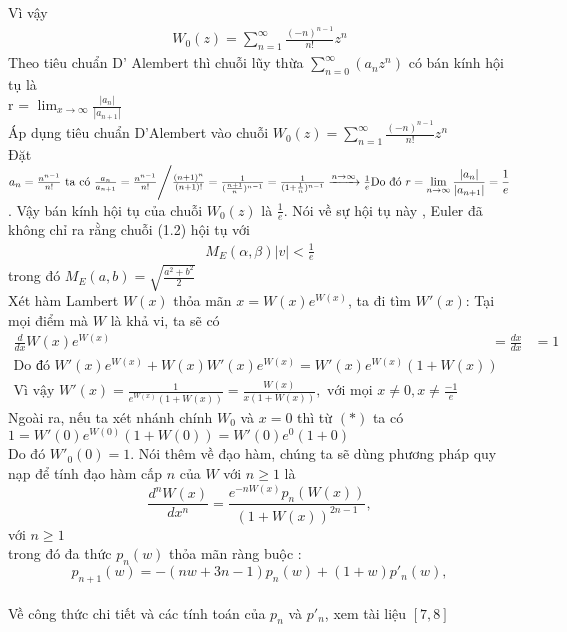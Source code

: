 Vì vậy
\begin{align*}
W_0(z) = \displaystyle \sum_{n=1}^{\infty}\frac{(-n)^{n-1}}{n!}z^{n}
\end{align*}
Theo tiêu chuẩn D' Alembert thì chuỗi lũy thừa $\displaystyle \sum_{n=0}^{\infty}(a_nz^{n})$ có bán kính hội tụ là  \\
r = $\displaystyle \lim_{x \to \infty}\frac{|a_n|}{|a_{n+1}|}$ \\
Áp dụng tiêu chuẩn D'Alembert vào chuỗi $W_0(z) = \displaystyle \sum_{n=1}^{\infty}\frac{(-n)^{n-1}}{n!}z^{n}$ \\
Đặt $a_n =\frac{n^{n-1}}{n!} \mbox{ ta có } \frac{a_n}{a_{n+1}} = \frac{n^{n-1}}{n!} \Bigg/ \frac{(n+1)^{n}}{(n+1)!} \\
= \frac{1}{(\frac{n+1}{n})^{n-1}} = \frac{1}{(1+\frac{1}{n})^{n-1}} \xrightarrow{n \rightarrow \infty} \frac{1}{e}\\
\mbox{Do đó }r = \displaystyle \lim_{n \to \infty}\frac{|a_n|}{|a_{n+1}|} = \frac{1}{e}$.
Vậy bán kính hội tụ của chuỗi $W_0(z)$ là $\frac{1}{e}$.
Nói về sự hội tụ này , Euler đã không chỉ ra rằng chuỗi (1.2) hội tụ với 
\begin{align*}
	M_E(\alpha,\beta)|v| < \frac{1}{e}
\end{align*}
trong đó $M_E(a,b) = \sqrt{\frac{a^2+b^2}{2}}$ \\
Xét hàm Lambert $W(x)$ thỏa mãn $x = W(x)e^{W(x)}$, ta đi tìm $W'(x)$:
Tại mọi điểm mà $W$ là khả vi, ta sẽ có 
\begin{align}
\frac{d}{dx}W(x)e^{W(x)} &= \frac{dx}{dx} &= 1 \nonumber \\  
\mbox{Do đó }W'(x)e^{W(x)} + W(x)W'(x)e^{W(x)} = W'(x)e^{W(x)}(1+W(x)) \tag{*}\\
\mbox{Vì vậy } W'(x) = \frac{1}{e^{W(x)}(1+W(x))} = \frac{W(x)}{x(1+W(x))} ,\mbox{ với mọi } x \neq 0, x \neq \frac{-1}{e} \nonumber
\end{align}
Ngoài ra, nếu ta xét nhánh chính $W_{0}$ và $x=0$ thì từ $(*)$ ta có $1 = W'(0)e^{W(0)}(1+W(0)) = W'(0)e^{0}(1+0)$ \\
Do đó $W'_{0}(0) = 1$.
Nói thêm về đạo hàm, chúng ta sẽ dùng phương pháp quy nạp để tính đạo hàm cấp $n$ của $W$ với $n \ge 1$ là 
$$ \frac{d^{n}W(x)}{dx^n} = \frac{e^{-nW(x)}p_n(W(x))}{(1+W(x))^{2n-1}},$$ với $n \ge 1 $ \\
trong đó đa thức $p_n(w)$ thỏa mãn ràng buộc :\\
$$ p_{n+1}(w) = -(nw + 3n - 1)p_n(w) + (1+w)p'_n(w), $$ \\
Về công thức chi tiết và các tính toán của $p_n$ và $p'_n$, xem tài liệu $[7,8]$ \\
